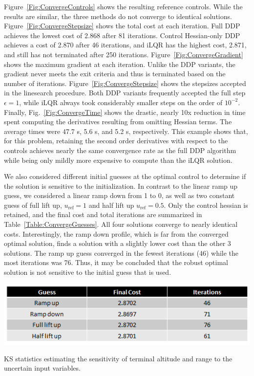 Figure~\ref{Fig:ConvergeControls} shows the resulting reference controls. While the results are similar, the three methods do not converge to identical solutions. 
Figure~\ref{Fig:ConvergeStepsize} shows the total cost at each iteration. Full DDP achieves the lowest cost of 2.868 after 81 iterations. Control Hessian-only DDP achieves a cost of 2.870 after 46 iterations, and iLQR has the highest cost, 2.871, and still has not terminated after 250 iterations. Figure~\ref{Fig:ConvergeGradient} shows the maximum gradient at each iteration. Unlike the DDP variants, the gradient never meets the exit criteria and thus is terminated based on the number of iterations. 
Figure~\ref{Fig:ConvergeStepsize} shows the stepsizes accepted in the linesearch procedure. Both DDP variants frequently accepted the full step $\epsilon=1$, while iLQR always took considerably smaller steps on the order of $ 10^{-2} $. Finally, Fig.~\ref{Fig:ConvergeTime} shows the drastic, nearly 10x reduction in time spent computing the derivatives resulting from omitting Hessian terms. The average times were 47.7 s, 5.6 s, and 5.2 s, respectively. 
This example shows that, for this problem, retaining the second order derivatives with respect to the controls achieves nearly the same convergence rate as the full DDP algorithm while being only mildly more expensive to compute than the iLQR solution. 

We also considered different initial guesses at the optimal control to determine if the solution is sensitive to the initialization. In contrast to the linear ramp up guess, we considered a linear ramp down from 1 to 0, as well as two constant guess of full lift up, $u_{\mathrm{ref}}=1$ and half lift up $u_{\mathrm{ref}}=0.5$. Only the control hessian is retained, and the final cost and total iterations are summarized in Table~\ref{Table:ConvergeGuesses}. All four solutions converge to nearly identical costs. Interestingly, the ramp down profile, which is far from the converged optimal solution, finds a solution with a slightly lower cost than the other 3 solutions. The ramp up guess converged in the fewest iterations (46) while the most iterations was 76. Thus, it may be concluded that the robust optimal solution is not sensitive to the initial guess that is used. 
\begin{table}[h!]
	\centering
	\includegraphics[width=1\textwidth]{Images/Convergence/ConvergeGuesses}
	\caption{KS statistics estimating the sensitivity of terminal altitude and range to the uncertain input variables.}
	\label{Table:ConvergeGuesses}
\end{table}

